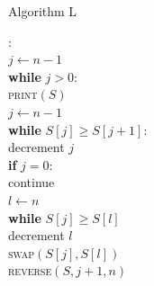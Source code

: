 \documentclass[aspectratio=169]{beamer}
\begin{document}
\begin{frame}{Algorithm L}
\begin{nalgo}
: 
\\\label{}  $j \gets n-1$
\\\label{}  \textbf{while} $j > 0$:\+ 
\\\label{}      \textsc{print}$(S)$ 
\\\label{}      $j \gets n-1$
\\\label{}      \textbf{while} $S[j] \geq S[j+1]$:\+
\\\label{}          decrement $j$\-
\\\label{}      \textbf{if} $j = 0$: \+
\\\label{}          continue \- 
\\\label{}      $l \gets n$ 
\\\label{}      \textbf{while} $S[j] \geq S[l]$ \+
\\\label{}          decrement $l$\-
\\\label{}      \textsc{swap}$(S[j], S[l])$
\\\label{}      \textsc{reverse}$(S, j+1, n)$
\end{nalgo}
\end{frame}
\end{document}
